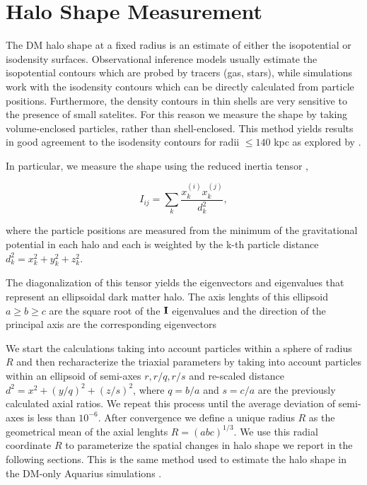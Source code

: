 \documentclass[usenatbib]{mnras}
\begin{document}
\section{Halo Shape Measurement}
\label{sec:method}

The DM halo shape at a fixed radius is an estimate of either
the isopotential or isodensity surfaces.  
Observational inference models usually estimate the 
isopotential contours which are probed by tracers (gas, stars), while
simulations work with the isodensity contours which can be directly
calculated from particle positions.  
Furthermore, the density contours in thin shells are very sensitive to
the presence of small satelites.  
For this reason we measure the shape by taking
volume-enclosed particles, rather than shell-enclosed.  
This method yields results in good agreement to the isodensity
contours for radii $\leq 140$ kpc as explored by
\citep{VeraCiro11}.  


In particular, we measure the shape using the reduced inertia tensor
\citep{Allgood06},  

\begin{equation}
I_{ij} = \sum_k \frac{x_k^{(i)}x_k^{(j)}}{d^2_k},
\label{eq:inertia}
\end{equation}

where the particle positions are measured from the minimum of the
gravitational potential in each halo and each is weighted by the k-th
particle distance $d_k^2=x_k^2+y_k^2+z_k^2$.

The diagonalization of this tensor yields the eigenvectors and
eigenvalues that represent an ellipsoidal dark matter halo.
The axis lenghts of this ellipsoid $a\geq b \geq c$ are the square
root of the ${\bf I}$ eigenvalues and the direction of the principal
axis are the corresponding eigenvectors 

We start the calculations taking into account particles within a
sphere of radius $R$ and then recharacterize the triaxial parameters
by taking into account particles within an ellipsoid of semi-axes
$r,r/q,r/s$ and re-scaled distance $d^2=x^2+(y/q)^2+(z/s)^2$, where $q
= b/a$ and $s=c/a$ are the previously calculated axial ratios. 
We repeat this process until the average deviation of semi-axes is
less than $10^{-6}$.  
After convergence we define a unique radius $R$ as the geometrical
mean of the axial lenghts $R=(abc)^{1/3}$.
We use this radial coordinate $R$ to parameterize the spatial changes
in halo shape we report in the following sections.
This is the same method used to estimate the halo shape in the DM-only
Aquarius simulations \citep{VeraCiro11}. 
\end{document}
